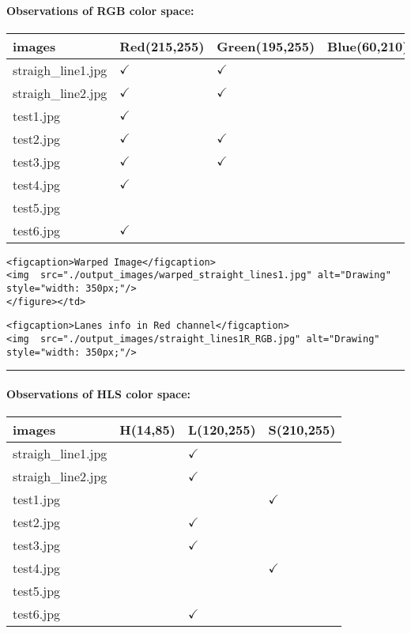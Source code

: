 \documentclass[11pt]{article}
\begin{document}
\paragraph{Observations of RGB color
space:}\label{observations-of-rgb-color-space}

\begin{longtable}[]{@{}llll@{}}
\toprule
images & Red(215,255) & Green(195,255) & Blue(60,210)\tabularnewline
\midrule
\endhead
straigh\_line1.jpg & \textbf{\(\checkmark\)} & \textbf{\(\checkmark\)}
&\tabularnewline
straigh\_line2.jpg & \textbf{\(\checkmark\)} & \textbf{\(\checkmark\)}
&\tabularnewline
test1.jpg & \textbf{\(\checkmark\)} & &\tabularnewline
test2.jpg & \textbf{\(\checkmark\)} & \textbf{\(\checkmark\)}
&\tabularnewline
test3.jpg & \textbf{\(\checkmark\)} & \textbf{\(\checkmark\)}
&\tabularnewline
test4.jpg & \textbf{\(\checkmark\)} & &\tabularnewline
test5.jpg & & &\tabularnewline
test6.jpg & \textbf{\(\checkmark\)} & &\tabularnewline
\bottomrule
\end{longtable}

\begin{verbatim}
<figcaption>Warped Image</figcaption>
<img  src="./output_images/warped_straight_lines1.jpg" alt="Drawing" style="width: 350px;"/>
</figure></td>
\end{verbatim}

\begin{verbatim}
<figcaption>Lanes info in Red channel</figcaption>
<img  src="./output_images/straight_lines1R_RGB.jpg" alt="Drawing" style="width: 350px;"/>
\end{verbatim}

\begin{center}\rule{0.5\linewidth}{\linethickness}\end{center}

\paragraph{Observations of HLS color
space:}\label{observations-of-hls-color-space}

\begin{longtable}[]{@{}llll@{}}
\toprule
images & H(14,85) & L(120,255) & S(210,255)\tabularnewline
\midrule
\endhead
straigh\_line1.jpg & & \textbf{\(\checkmark\)} &\tabularnewline
straigh\_line2.jpg & & \textbf{\(\checkmark\)} &\tabularnewline
test1.jpg & & & \textbf{\(\checkmark\)}\tabularnewline
test2.jpg & & \textbf{\(\checkmark\)} &\tabularnewline
test3.jpg & & \textbf{\(\checkmark\)} &\tabularnewline
test4.jpg & & & \textbf{\(\checkmark\)}\tabularnewline
test5.jpg & & &\tabularnewline
test6.jpg & & \textbf{\(\checkmark\)} &\tabularnewline
\bottomrule
\end{longtable}
\end{document}
